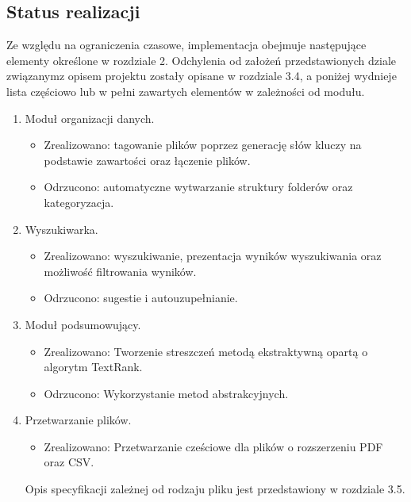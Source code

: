\documentclass[12pt,a4paper,twoside]{article}
\begin{document}
\subsection{Status realizacji}
Ze względu na ograniczenia czasowe, implementacja obejmuje następujące elementy określone w rozdziale 2. Odchylenia od założeń przedstawionych dziale związanym\break z opisem projektu zostały opisane w rozdziale 3.4, a poniżej wydnieje lista częściowo lub w pełni zawartych elementów w zależności od modułu. 
\begin{enumerate}
	\vspace{-0.2cm}\item Moduł organizacji danych.
	\begin{itemize}
		\vspace{-0.2cm}\item Zrealizowano: tagowanie plików poprzez generację słów kluczy na podstawie zawartości oraz łączenie plików.
		\vspace{-0.2cm}\item Odrzucono: automatyczne wytwarzanie struktury folderów oraz kategoryzacja.
	\end{itemize}
	\vspace{-0.2cm}\item Wyszukiwarka.
	\begin{itemize}
		\vspace{-0.2cm}\item Zrealizowano: wyszukiwanie, prezentacja wyników wyszukiwania oraz możliwość filtrowania wyników.
		\vspace{-0.2cm}\item Odrzucono: sugestie i autouzupełnianie.
	\end{itemize}
	\vspace{-0.2cm}\item Moduł podsumowujący.
	\begin{itemize}
		\vspace{-0.2cm}\item Zrealizowano: Tworzenie streszczeń metodą ekstraktywną opartą o algorytm TextRank.
		\vspace{-0.2cm}\item Odrzucono: Wykorzystanie metod abstrakcyjnych.
	\end{itemize}
	\vspace{-0.2cm}\item Przetwarzanie plików.
	\begin{itemize}
		\vspace{-0.2cm}\item Zrealizowano: Przetwarzanie cześciowe dla plików o rozszerzeniu PDF oraz CSV.
	\end{itemize}
	\vspace{-0.2cm}Opis specyfikacji zależnej od rodzaju pliku jest przedstawiony w rozdziale 3.5.
\end{enumerate}\vspace{-0.8cm}
\end{document}
